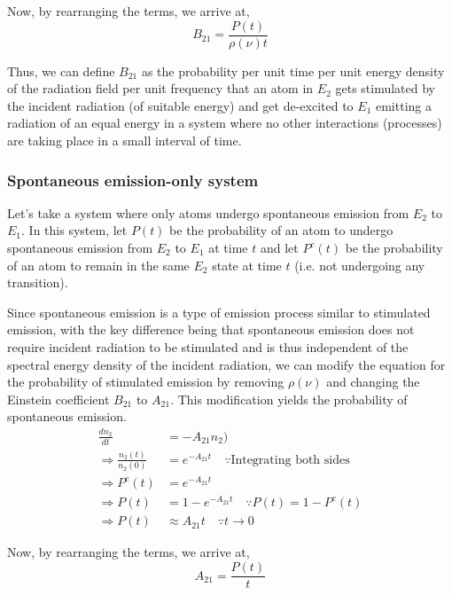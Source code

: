 \documentclass[12pt]{article}
\begin{document}
Now, by rearranging the terms, we arrive at,
\begin{equation*}
    B_{21} = \frac{P(t)}{\rho(\nu)t}
\end{equation*}

Thus, we can define $B_{21}$ as the probability per unit time per unit energy density of the radiation field per unit frequency that an atom in $E_{2}$ gets stimulated by the incident radiation (of suitable energy) and get de-excited to $E_{1}$ emitting a radiation of an equal energy in a system where no other interactions (processes) are taking place in a small interval of time.

\subsubsection{Spontaneous emission-only system}

Let's take a system where only atoms undergo spontaneous emission from $E_{2}$ to $E_{1}$. In this system, let $P(t)$ be the probability of an atom to undergo spontaneous emission from $E_{2}$ to $E_{1}$ at time $t$ and let $P^c(t)$ be the probability of an atom to remain in the same $E_{2}$ state at time $t$ (i.e. not undergoing any transition). \vspace{.2cm}

Since spontaneous emission is a type of emission process similar to stimulated emission, with the key difference being that spontaneous emission does not require incident radiation to be stimulated and is thus independent of the spectral energy density of the incident radiation, we can modify the equation for the probability of stimulated emission by removing $\rho(\nu)$ and changing the Einstein coefficient $B_{21}$ to $A_{21}$. This modification yields the probability of spontaneous emission.
\begin{align*}
    \frac{dn_{2}}{dt} &= -A_{21}n_{2}) \\
    \Rightarrow \frac{n_2(t)}{n_2(0)} &= e^{-A_{21}t} \quad \because \text{Integrating both sides} \\
    \Rightarrow P^c(t) &= e^{-A_{21}t} \\
    \Rightarrow P(t) &= 1 - e^{-A_{21}t} \quad \because P(t) = 1 - P^c(t) \\
    \Rightarrow P(t) & \approx A_{21}t \quad \because t \to 0
\end{align*}

Now, by rearranging the terms, we arrive at,
\begin{equation*}
    A_{21} = \frac{P(t)}{t}
\end{equation*}
\end{document}
